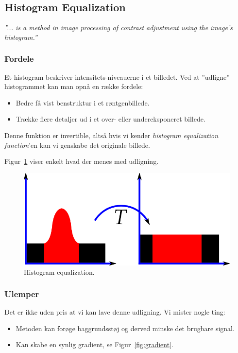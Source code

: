 \subsection{Histogram Equalization}\label{sec:histogram-processing}

\begin{center}
	\textit{''... is a method in image processing of contrast adjustment using the image's histogram.''}
\end{center}

\subsubsection{Fordele}

Et histogram beskriver intensitets-niveauerne i et billedet. Ved at ''udligne'' histogrammet kan man opnå en række fordele:

\begin{itemize}
	\item Bedre få vist benstruktur i et røntgenbillede.
	\item Trække flere detaljer ud i et over- eller undereksponeret billede.
\end{itemize}

Denne funktion er invertible, altså hvis vi kender \textit{histogram equalization function}'en kan vi genskabe det originale billede.

Figur~\ref{fig:histogram-eq} viser enkelt hvad der menes med udligning.

\begin{figure}[h]
	\centering
	\includegraphics[width=0.6\linewidth]{figs/spm01/histogram-eq.png}
	\caption{Histogram equalization.}
	\label{fig:histogram-eq}
\end{figure}

\subsubsection{Ulemper}
Det er ikke uden pris at vi kan lave denne udligning. Vi mister nogle ting:

\begin{itemize}
	\item Metoden kan forøge baggrundsstøj og derved minske det brugbare signal.
	\item Kan skabe en synlig gradient, se Figur~\ref{fig:gradient}.
\end{itemize}

